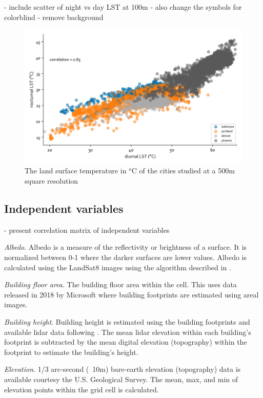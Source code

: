 \documentclass[final,3p,times,twocolumn,sort&compress]{elsarticle}
\begin{document}
- include scatter of night vs day LST at 100m - also change the symbols for colorblind - remove background
\begin{figure}[h]
\begin{center}
\includegraphics[width=\linewidth]{fig/report/lst_night-vs-day_500.png}
\caption{The land surface temperature in $^o$C of the cities studied at a 500m square resolution}
\label{fig:scatter_lst}
\end{center}
\end{figure}
\subsection{Independent variables}
- present correlation matrix of independent variables

\textit{Albedo}. Albedo is a measure of the reflectivity or brightness of a surface. It is normalized between 0-1 where the darker surfaces are lower values. Albedo is calculated using the LandSat8 images using the algorithm described in \cite{Smith2010-nw, Liang2001-jd}. 

\textit{Building floor area}. The building floor area within the cell. This uses data released in 2018 by Microsoft where building footprints are estimated using areal images. 

\textit{Building height}. Building height is estimated using the building footprints and available lidar data following \cite{Chun2017-mm}. The mean lidar elevation within each building's footprint is subtracted by the mean digital elevation (topography) within the footprint to estimate the building's height.

\textit{Elevation}. 1/3 arc-second (~10m) bare-earth elevation (topography) data is available courtesy the U.S. Geological Survey. The mean, max, and min of elevation points within the grid cell is calculated.
\end{document}
